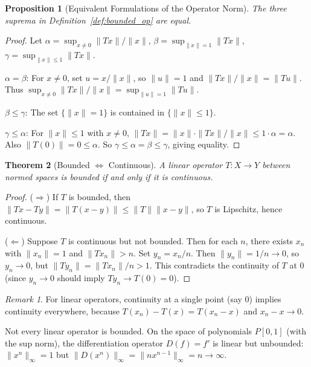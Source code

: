 \documentclass[11pt,a4paper]{article}
\theoremstyle{definition}
\theoremstyle{plain}
\newtheorem{theorem}{Theorem}[section]
\newtheorem{proposition}[theorem]{Proposition}
\theoremstyle{remark}
\newtheorem{remark}{Remark}[section]
\begin{document}
\begin{proposition}[Equivalent Formulations of the Operator Norm]
\label{prop:op_norm_equiv}
The three suprema in Definition~\ref{def:bounded_op} are equal.
\end{proposition}

\begin{proof}
Let $\alpha = \sup_{x \ne 0} \|Tx\|/\|x\|$, $\beta = \sup_{\|x\|=1} \|Tx\|$,
$\gamma = \sup_{\|x\| \le 1} \|Tx\|$.

$\alpha = \beta$: For $x \ne 0$, set $u = x/\|x\|$, so $\|u\| = 1$ and
$\|Tx\|/\|x\| = \|Tu\|$. Thus $\sup_{x \ne 0} \|Tx\|/\|x\| =
\sup_{\|u\|=1} \|Tu\|$.

$\beta \le \gamma$: The set $\{\|x\| = 1\}$ is contained in $\{\|x\| \le 1\}$.

$\gamma \le \alpha$: For $\|x\| \le 1$ with $x \ne 0$,
$\|Tx\| = \|x\| \cdot \|Tx\|/\|x\| \le 1 \cdot \alpha = \alpha$. Also $\|T(0)\| = 0 \le \alpha$.
So $\gamma \le \alpha = \beta \le \gamma$, giving equality.
\end{proof}

\begin{theorem}[Bounded $\Leftrightarrow$ Continuous]
\label{thm:bounded_iff_cts}
A linear operator $T \colon X \to Y$ between normed spaces is bounded if and only
if it is continuous.
\end{theorem}

\begin{proof}
($\Rightarrow$) If $T$ is bounded, then $\|Tx - Ty\| = \|T(x-y)\| \le \|T\| \|x - y\|$,
so $T$ is Lipschitz, hence continuous.

($\Leftarrow$) Suppose $T$ is continuous but not bounded. Then for each $n$, there
exists $x_n$ with $\|x_n\| = 1$ and $\|Tx_n\| > n$. Set $y_n = x_n/n$. Then
$\|y_n\| = 1/n \to 0$, so $y_n \to 0$, but $\|Ty_n\| = \|Tx_n\|/n > 1$. This
contradicts the continuity of $T$ at $0$ (since $y_n \to 0$ should imply
$Ty_n \to T(0) = 0$).
\end{proof}

\begin{remark}
For linear operators, continuity at a single point (say $0$) implies continuity
everywhere, because $T(x_n) - T(x) = T(x_n - x)$ and $x_n - x \to 0$.
\end{remark}

\begin{warning}
Not every linear operator is bounded. On the space of polynomials $P[0,1]$ (with
the sup norm), the differentiation operator $D(f) = f'$ is linear but unbounded:
$\|x^n\|_\infty = 1$ but $\|D(x^n)\|_\infty = \|n x^{n-1}\|_\infty = n \to \infty$.
\end{warning}
\end{document}
